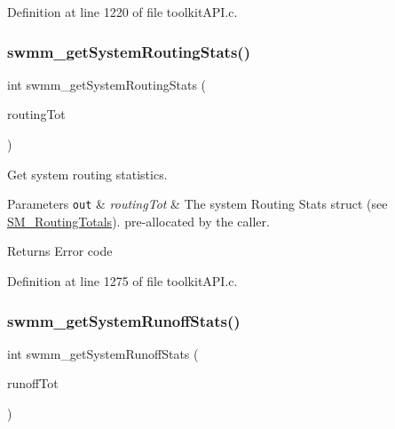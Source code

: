 Definition at line 1220 of file toolkit\+A\+P\+I.\+c.

\mbox{\label{group__tkfuncs_ga8e4dcd4d9243ac428633e7cdabf0712a}} 
\subsubsection{\texorpdfstring{swmm\+\_\+get\+System\+Routing\+Stats()}{swmm\_getSystemRoutingStats()}}
{\footnotesize\ttfamily int swmm\+\_\+get\+System\+Routing\+Stats (\begin{DoxyParamCaption}\item[{\hyperlink{struct_s_m___routing_totals}{S\+M\+\_\+\+Routing\+Totals} $\ast$}]{routing\+Tot }\end{DoxyParamCaption})}



Get system routing statistics. 


\begin{DoxyParams}[1]{Parameters}
\mbox{\tt out}  & {\em routing\+Tot} & The system Routing Stats struct (see \hyperlink{struct_s_m___routing_totals}{S\+M\+\_\+\+Routing\+Totals}). pre-\/allocated by the caller. \\
\hline
\end{DoxyParams}
\begin{DoxyReturn}{Returns}
Error code 
\end{DoxyReturn}


Definition at line 1275 of file toolkit\+A\+P\+I.\+c.

\mbox{\label{group__tkfuncs_gabf3ea290e2af763289e18db435ea2ccd}} 
\subsubsection{\texorpdfstring{swmm\+\_\+get\+System\+Runoff\+Stats()}{swmm\_getSystemRunoffStats()}}
{\footnotesize\ttfamily int swmm\+\_\+get\+System\+Runoff\+Stats (\begin{DoxyParamCaption}\item[{\hyperlink{struct_s_m___runoff_totals}{S\+M\+\_\+\+Runoff\+Totals} $\ast$}]{runoff\+Tot }\end{DoxyParamCaption})}



